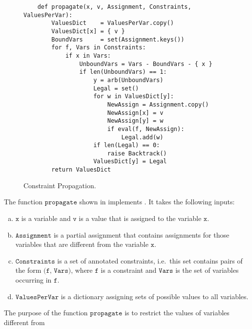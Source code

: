 \begin{figure}[!ht]
\centering
\begin{verbatim}
    def propagate(x, v, Assignment, Constraints, ValuesPerVar):
        ValuesDict    = ValuesPerVar.copy()
        ValuesDict[x] = { v }
        BoundVars     = set(Assignment.keys())
        for f, Vars in Constraints:
            if x in Vars:
                UnboundVars = Vars - BoundVars - { x }
                if len(UnboundVars) == 1:
                    y = arb(UnboundVars)
                    Legal = set()
                    for w in ValuesDict[y]:
                        NewAssign = Assignment.copy()
                        NewAssign[x] = v
                        NewAssign[y] = w
                        if eval(f, NewAssign):
                            Legal.add(w)
                    if len(Legal) == 0:
                        raise Backtrack()
                    ValuesDict[y] = Legal
        return ValuesDict
\end{verbatim}
\vspace*{-0.3cm}
\caption{Constraint Propagation.}
\label{fig:Constraint-Propagation-Solver.ipynb:propagate}
\end{figure}
\noindent
The function $\texttt{propagate}$ shown in  implements
.  It takes the following inputs:
\begin{enumerate}[(a)]
\item $\texttt{x}$ is a variable and $\texttt{v}$ is a value that is assigned to the variable $\texttt{x}$.
\item $\texttt{Assignment}$ is a partial assignment that contains assignments for those variables that are
      different from the variable $\texttt{x}$.
\item $\texttt{Constraints}$ is a set of annotated constraints, i.e.~this set contains pairs of the form 
      $\texttt{(f, Vars)}$, where $\texttt{f}$ is a constraint and $\texttt{Vars}$ is the set of variables occurring in $\texttt{f}$.
\item $\texttt{ValuesPerVar}$ is a dictionary assigning sets of possible values to all variables.
\end{enumerate}
The purpose of the function  $\texttt{propagate}$ is to restrict the values of variables different from
